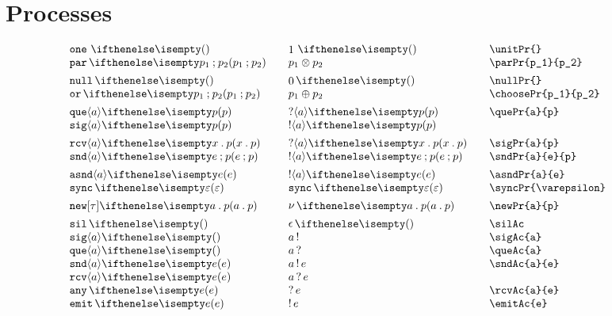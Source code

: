 \documentclass[11pt]{article}
\begin{document}
\section*{Processes}
\begin{small}
  \begin{displaymath}
    \begin{array}{l@{\qquad}l@{\qquad}l@{\qquad}l}
      \unitPr{}            & \unitPr*{}            & \verb|\unitPr{} |           \\
      \parPr{p_1}{p_2}     & \parPr*{p_1}{p_2}     & \verb|\parPr{p_1}{p_2}|     \\[1ex]
      \nullPr{}            & \nullPr*{}            & \verb|\nullPr{}|            \\
      \choosePr{p_1}{p_2}  & \choosePr*{p_1}{p_2}  & \verb|\choosePr{p_1}{p_2}|  \\[1ex]
      \quePr{a}{p}         & \quePr*{a}{p}         & \verb|\quePr{a}{p}|         \\
      \sigPr{a}{p}         & \sigPr*{a}{p}         & \verb||                     \\[1ex]
      \rcvPr{a}{x}{p}      & \rcvPr*{a}{x}{p}      & \verb|\sigPr{a}{p}|         \\
      \sndPr{a}{e}{p}      & \sndPr*{a}{e}{p}      & \verb|\sndPr{a}{e}{p}|      \\[1ex]
      \asndPr{a}{e}        & \asndPr*{a}{e}        & \verb|\asndPr{a}{e}|        \\
      \syncPr{\varepsilon} & \syncPr*{\varepsilon} & \verb|\syncPr{\varepsilon}| \\[1ex]
      \newPr{a}{p}         & \newPr*{a}{p}         & \verb|\newPr{a}{p}|         \\[1ex]
      \silAc               & \silAc*               & \verb|\silAc|               \\
      \sigAc{a}            & \sigAc*{a}            & \verb|\sigAc{a}|            \\
      \queAc{a}            & \queAc*{a}            & \verb|\queAc{a}|            \\
      \sndAc{a}{e}         & \sndAc*{a}{e}         & \verb|\sndAc{a}{e}|         \\
      \rcvAc{a}{e}         & \rcvAc*{a}{e}         & \verb||                     \\
      \anyAc{e}            & \anyAc*{e}            & \verb|\rcvAc{a}{e}|         \\
      \emitAc{e}           & \emitAc*{e}           & \verb|\emitAc{e}|
    \end{array}
  \end{displaymath}
\end{small}
\end{document}
